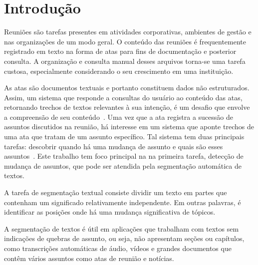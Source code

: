 

\section{Introdução}
	\label{sec:introducao}

Reuniões são tarefas presentes em atividades corporativas, ambientes de gestão e nas organizações de um modo geral. O conteúdo das reuniões é frequentemente registrado
em texto na forma de atas para fins de documentação e posterior consulta. A organização e consulta manual desses arquivos torna-se uma tarefa custosa, especialmente considerando o seu crescimento em uma instituição. 

As atas são documentos textuais e portanto constituem dados não estruturados. Assim, um sistema que responde a consultas do usuário ao conteúdo das atas, retornando trechos de textos relevantes à sua intenção, é um desafio que envolve a compreensão de seu conteúdo~\cite{Bokaei2015}. 
Uma vez que a ata registra a sucessão de assuntos discutidos na reunião, há interesse em um sistema que aponte trechos de uma ata que tratam de um assunto específico. Tal sistema tem duas principais tarefas: descobrir quando há uma mudança de assunto e quais são esses assuntos~\cite{Banerjee2006}. Este trabalho tem foco principal na na primeira tarefa, detecção de mudança de assuntos, que pode ser atendida pela segmentação automática de textos.



A tarefa de segmentação textual consiste dividir um texto em partes que contenham um significado relativamente independente. Em outras palavras, é identificar as posições onde há uma mudança significativa de tópicos. 

A segmentação de textos é útil em aplicações que trabalham com textos sem indicações de quebras de assunto, ou seja, não apresentam seções ou capítulos, como transcrições automáticas de áudio, vídeos e grandes documentos que contêm vários assuntos como atas de reunião e notícias.



